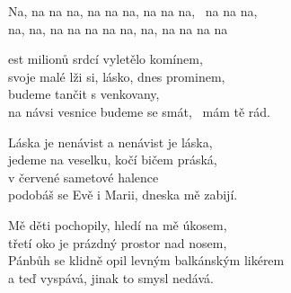
\cho{}
Na, \hspace{1em} na na na, \hspace{1em} na na na, \hspace{1em} na na na, \ na na na,\\
na, \hspace{1em} na, \hspace{1em} na na na na na, \hspace{1em} na, \hspace{1em} na na na na 

\ve{}
est milionů srdcí vyletělo komínem,\\
svoje malé lži si, lásko, dnes prominem,\\
budeme tančit s venkovany,\\
na návsi vesnice budeme se smát,  \ mám tě rád. 

\cho{}

\ve{}
Láska je nenávist a nenávist je láska,\\
jedeme na veselku, kočí bičem práská,\\
v červené sametové halence\\
podobáš se Evě i Marii, dneska mě zabijí.

\cho{}

\ve{}
Mě děti pochopily, hledí na mě úkosem,\\
třetí oko je prázdný prostor nad nosem,\\
Pánbůh se klidně opil levným balkánským likérem\\
a teď vyspává, jinak to smysl nedává.

\cho{}

\esong